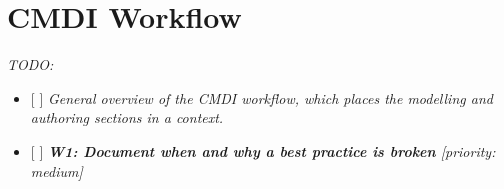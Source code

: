 \chapter{CMDI Workflow}\label{cmdi-workflow}

\emph{TODO:}

\begin{itemize}
\tightlist
\item
  {[} {]} \emph{General overview of the CMDI workflow, which places the
  modelling and authoring sections in a context.}
\item
  {[} {]} \emph{\textbf{W1: Document when and why a best practice is
  broken} {[}priority: medium{]}}
\end{itemize}
